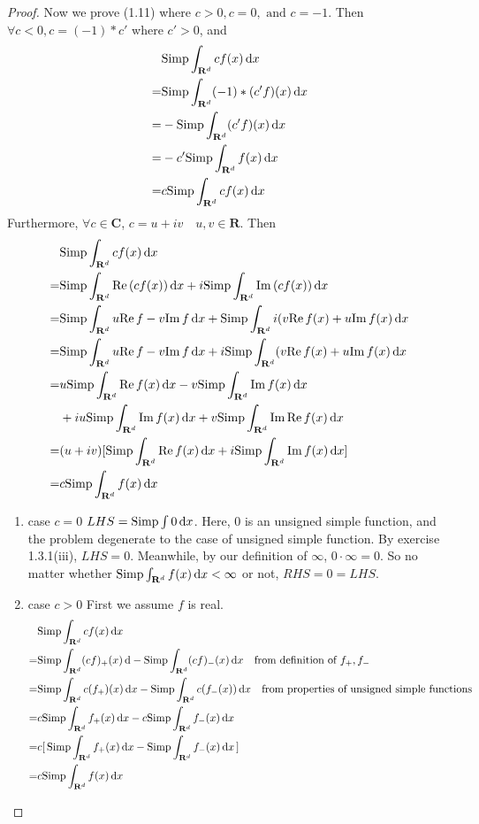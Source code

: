 \documentclass{article}
\begin{document}
\begin{proof}
Now we prove (1.11) where $c>0,c=0,\text{ and }c=-1$. Then $\forall c<0,c=(-1)*c'$ where $c'>0$, and 
\[\begin{aligned}
&\mathrm{Simp}\int_{\mathbf{R}^d}cf(x)\,\mathrm{d} x\\
=&\mathrm{Simp}\int_{\mathbf{R}^d}(-1)*(c'f)(x)\,\mathrm{d} x\\
=&-\mathrm{Simp}\int_{\mathbf{R}^d}(c'f)(x)\,\mathrm{d} x\\
=&-c'\mathrm{Simp}\int_{\mathbf{R}^d}f(x)\,\mathrm{d} x\\
=&c\mathrm{Simp}\int_{\mathbf{R}^d}cf(x)\,\mathrm{d} x
\end{aligned}\]
Furthermore, $\forall c\in\mathbf{C}$, $c=u+iv\quad u,v\in \mathbf{R}$. Then
\[\begin{aligned}
&\mathrm{Simp}\int_{\mathbf{R}^d}cf(x)\,\mathrm{d} x\\
=&\mathrm{Simp}\int_{\mathbf{R}^d}\mathrm{Re}\,(cf(x))\,\mathrm{d} x+i\mathrm{Simp}\int_{\mathbf{R}^d}\mathrm{Im}\,(cf(x))\,\mathrm{d} x\\
=&\mathrm{Simp}\int_{\mathbf{R}^d} u\mathrm{Re}\, f-v\mathrm{Im}\, f\,\mathrm{d} x+\mathrm{Simp}\int_{\mathbf{R}^d}i(v\mathrm{Re}\, f(x)+u\mathrm{Im}\, f(x)\,\mathrm{d} x\\
=&\mathrm{Simp}\int_{\mathbf{R}^d} u\mathrm{Re}\, f-v\mathrm{Im}\, f\,\mathrm{d} x+i\mathrm{Simp}\int_{\mathbf{R}^d}(v\mathrm{Re}\, f(x)+u\mathrm{Im}\, f(x)\,\mathrm{d} x\\
=&u\mathrm{Simp}\int_{\mathbf{R}^d}\mathrm{Re}\, f(x)\,\mathrm{d} x-v\mathrm{Simp}\int_{\mathbf{R}^d}\mathrm{Im}\, f(x)\,\mathrm{d} x\\
&+iu\mathrm{Simp}\int_{\mathbf{R}^d}\mathrm{Im}\, f(x)\,\mathrm{d} x+v\mathrm{Simp}\int_{\mathbf{R}^d}\mathrm{Im}\, \mathrm{Re}\, f(x)\,\mathrm{d} x\\
=&(u+iv)[\mathrm{Simp}\int_{\mathbf{R}^d}\mathrm{Re}\, f(x)\,\mathrm{d} x+i\mathrm{Simp}\int_{\mathbf{R}^d}\mathrm{Im}\, f(x)\,\mathrm{d} x]\\
=&c\mathrm{Simp}\int_{\mathbf{R}^d}f(x)\,\mathrm{d} x
\end{aligned}\]


\begin{enumerate}
\item{case $c=0$}
$LHS=\mathrm{Simp}\int 0\,\mathrm{d} x$. Here, $0$ is an unsigned simple function, and the problem degenerate to the case of unsigned simple function. By exercise 1.3.1(iii), $LHS=0$. Meanwhile, by our definition of $\infty$, $0\cdot \infty=0$. So no matter whether $\mathrm{Simp}\int_{\mathbf{R}^d}f(x)\,\mathrm{d} x<\infty$ or not, $RHS=0=LHS$.
\item{case $c>0$}
First we assume $f$ is real. 
\[\begin{aligned}
&\mathrm{Simp}\int_{\mathbf{R}^d}cf(x)\,\mathrm{d} x\\
=&\mathrm{Simp}\int_{\mathbf{R}^d}(cf)_+(x)\,\mathrm{d} -\mathrm{Simp}\int_{\mathbf{R}^d}(cf)_-(x)\,\mathrm{d} x\quad\text{from definition of }f_+,f_-\\
=&\mathrm{Simp}\int_{\mathbf{R}^d}c(f_+)(x)\,\mathrm{d} x-\mathrm{Simp}\int_{\mathbf{R}^d}c(f_-(x))\,\mathrm{d} x\quad\text{from properties of unsigned simple functions}\\
=&c\mathrm{Simp}\int_{\mathbf{R}^d}f_+(x)\,\mathrm{d} x-c\mathrm{Simp}\int_{\mathbf{R}^d}f_-(x)\,\mathrm{d} x\\
=&c[\,\mathrm{Simp}\int_{\mathbf{R}^d}f_+(x)\,\mathrm{d} x-\mathrm{Simp}\int_{\mathbf{R}^d}f_-(x)\,\mathrm{d} x\,]\\
=&c\mathrm{Simp}\int_{\mathbf{R}^d}f(x)\,\mathrm{d} x
\end{aligned}\] 


\end{enumerate}
\end{proof}
\end{document}
